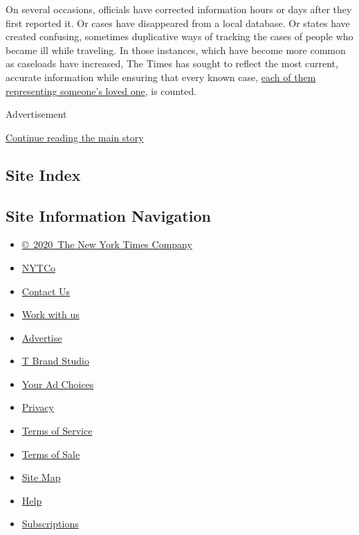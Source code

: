On several occasions, officials have corrected information hours or days
after they first reported it. Or cases have disappeared from a local
database. Or states have created confusing, sometimes duplicative ways
of tracking the cases of people who became ill while traveling. In those
instances, which have become more common as caseloads have increased,
The Times has sought to reflect the most current, accurate information
while ensuring that every known case,
\href{https://www.nytimes.com/2020/03/22/us/coronavirus-deaths-united-states.html}{each
of them representing someone's loved one}, is counted.

Advertisement

\protect\hyperlink{after-bottom}{Continue reading the main story}

\hypertarget{site-index}{%
\subsection{Site Index}\label{site-index}}

\hypertarget{site-information-navigation}{%
\subsection{Site Information
Navigation}\label{site-information-navigation}}

\begin{itemize}
\tightlist
\item
  \href{https://help.nytimes.com/hc/en-us/articles/115014792127-Copyright-notice}{©~2020~The
  New York Times Company}
\end{itemize}

\begin{itemize}
\tightlist
\item
  \href{https://www.nytco.com/}{NYTCo}
\item
  \href{https://help.nytimes.com/hc/en-us/articles/115015385887-Contact-Us}{Contact
  Us}
\item
  \href{https://www.nytco.com/careers/}{Work with us}
\item
  \href{https://nytmediakit.com/}{Advertise}
\item
  \href{http://www.tbrandstudio.com/}{T Brand Studio}
\item
  \href{https://www.nytimes.com/privacy/cookie-policy\#how-do-i-manage-trackers}{Your
  Ad Choices}
\item
  \href{https://www.nytimes.com/privacy}{Privacy}
\item
  \href{https://help.nytimes.com/hc/en-us/articles/115014893428-Terms-of-service}{Terms
  of Service}
\item
  \href{https://help.nytimes.com/hc/en-us/articles/115014893968-Terms-of-sale}{Terms
  of Sale}
\item
  \href{https://spiderbites.nytimes.com}{Site Map}
\item
  \href{https://help.nytimes.com/hc/en-us}{Help}
\item
  \href{https://www.nytimes.com/subscription?campaignId=37WXW}{Subscriptions}
\end{itemize}
